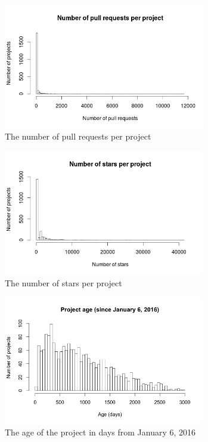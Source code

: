 	    \begin{figure}
	        \includegraphics[width=250pt]{figures/number-of-pull-requests-per-project}
	        \caption{The number of pull requests per project}
	        \label{fig:nr-pull-requests-plot}
	    \end{figure}

	    \begin{figure}
	        \includegraphics[width=250pt]{figures/number-of-stars-per-project}
	        \caption{The number of stars per project}
	        \label{fig:nr-stars-plot}
	    \end{figure}

	    \begin{figure}
	        \includegraphics[width=250pt]{figures/project-age}
	        \caption{The age of the project in days from January 6, 2016}
	        \label{fig:age-plot}
	    \end{figure}

